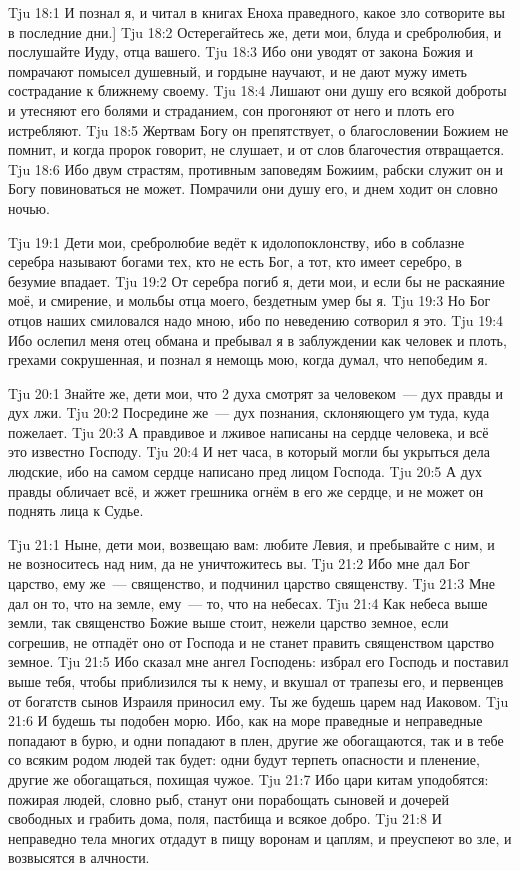 \vs Tju 18:1
И познал я, и читал в книгах Еноха праведного,
какое зло сотворите вы в последние дни.]
\vs Tju 18:2
Остерегайтесь же, дети мои, блуда и сребролюбия, и послушайте Иуду,
отца вашего.
\vs Tju 18:3
Ибо они уводят от закона
Божия и помрачают помысел душевный,
и гордыне научают, и не дают мужу иметь сострадание к ближнему своему.
\vs Tju 18:4
Лишают они душу его всякой доброты
и утесняют его болями и страданием,
сон прогоняют от него и плоть его истребляют.
\vs Tju 18:5
Жертвам Богу он препятствует, о благословении Божием не помнит,
и когда пророк говорит, не слушает, и от слов благочестия отвращается.
\vs Tju 18:6
Ибо двум страстям, противным заповедям Божиим,
рабски служит он и Богу повиноваться не может.
Помрачили они душу его, и днем ходит он словно ночью.

\vs Tju 19:1
Дети мои, сребролюбие ведёт к идолопоклонству,
ибо в соблазне серебра называют богами тех,
кто не есть Бог, а тот, кто имеет серебро, в безумие впадает.
\vs Tju 19:2
От серебра погиб я, дети мои, и если бы не раскаяние моё,
и смирение, и мольбы отца моего, бездетным умер бы я.
\vs Tju 19:3
Но Бог отцов наших смиловался надо мною,
ибо по неведению сотворил я это.
\vs Tju 19:4
Ибо ослепил меня отец обмана и пребывал я в заблуждении
как человек и плоть, грехами сокрушенная, и познал я немощь мою,
когда думал, что непобедим я.

\vs Tju 20:1
Знайте же, дети мои, что 2 духа смотрят
за человеком~--- дух правды и дух лжи.
\vs Tju 20:2
Посредине же~--- дух познания, склоняющего ум туда, куда пожелает.
\vs Tju 20:3
А правдивое и лживое написаны на сердце человека, и всё это известно Господу.
\vs Tju 20:4
И нет часа, в который могли бы укрыться дела людские,
ибо на самом сердце написано пред лицом Господа.
\vs Tju 20:5
А дух правды обличает всё, и жжет грешника огнём в его же сердце,
и не может он поднять лица к Судье.

\vs Tju 21:1
Ныне, дети мои, возвещаю вам:
любите Левия, и пребывайте с ним, и не возноситесь над ним,
да не уничтожитесь вы.
\vs Tju 21:2
Ибо мне дал Бог царство, ему же~--- священство,
и подчинил царство священству.
\vs Tju 21:3
Мне дал он то, что на земле, ему~--- то, что на небесах.
\vs Tju 21:4
Как небеса выше земли,
так священство Божие выше стоит, нежели царство земное,
если согрешив, не отпадёт оно от Господа
и не станет править священством царство земное.
\vs Tju 21:5
Ибо сказал мне ангел Господень: избрал его Господь и поставил выше тебя,
чтобы приблизился ты к нему, и вкушал от трапезы его,
и первенцев от богатств сынов Израиля приносил ему.
Ты же будешь царем над Иаковом.
\vs Tju 21:6
И будешь ты подобен морю.
Ибо, как на море праведные и неправедные попадают в бурю,
и одни попадают в плен, другие же обогащаются,
так и в тебе со всяким родом людей так будет:
одни будут терпеть опасности и пленение,
другие же обогащаться, похищая чужое.
\vs Tju 21:7
Ибо цари китам уподобятся: пожирая людей, словно рыб,
станут они порабощать сыновей и дочерей свободных и грабить дома,
поля, пастбища и всякое добро.
\vs Tju 21:8
И неправедно тела многих отдадут в пищу воронам и цаплям,
и преуспеют во зле, и возвысятся в алчности.

